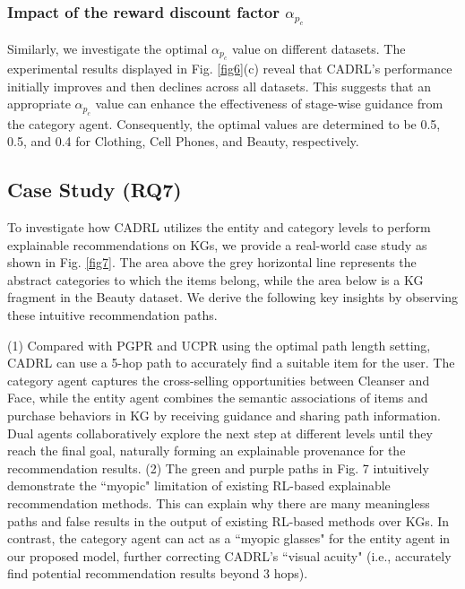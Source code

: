 \documentclass[conference]{IEEEtran}
\begin{document}
\subsubsection{Impact of the reward discount factor $\alpha_{p_c}$}

Similarly, we investigate the optimal $\alpha_{p_c}$ value on different datasets.  The experimental results displayed in Fig. \ref{fig6}(c) reveal that CADRL’s performance initially improves and then declines across all datasets. This suggests that an appropriate $\alpha_{p_c}$ value can enhance the effectiveness of stage-wise guidance from the category agent. Consequently, the optimal values are determined to be 0.5, 0.5, and 0.4 for Clothing, Cell Phones, and Beauty, respectively.

 

\subsection{Case Study (RQ7)}

To investigate how CADRL utilizes the entity and category levels to perform explainable recommendations on KGs, we provide a real-world case study as shown in Fig. \ref{fig7}. The area above the grey horizontal line represents the abstract categories to which the items belong, while the area below is a KG fragment in the Beauty dataset. We derive the following key insights by observing these intuitive recommendation paths.

(1) Compared with PGPR and UCPR using the optimal path length setting, CADRL can use a 5-hop path to accurately find a suitable item for the user. The category agent captures the cross-selling opportunities between Cleanser and Face, while the entity agent combines the semantic associations of items and purchase behaviors in KG by receiving guidance and sharing path information. Dual agents collaboratively explore the next step at different levels until they reach the final goal, naturally forming an explainable provenance for the recommendation results. (2) The green and purple paths in Fig. 7 intuitively demonstrate the ``myopic" limitation of existing RL-based explainable recommendation methods. This can explain why there are many meaningless paths and false results in the output of existing RL-based methods over KGs. In contrast, the category agent can act as a ``myopic glasses" for the entity agent in our proposed model, further correcting CADRL's ``visual acuity"   (i.e., accurately find potential recommendation results beyond 3 hops).
\end{document}
